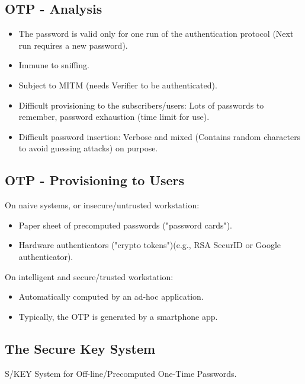 \subsection*{OTP - Analysis}
\begin{itemize}
    \item The password is valid only for one run of the authentication protocol (Next run requires a new password).
    \item Immune to sniffing.
    \item Subject to MITM (needs Verifier to be authenticated).
    \item Difficult provisioning to the subscribers/users: Lots of passwords to remember, password exhaustion (time limit for use).
    \item Difficult password insertion: Verbose and mixed (Contains random characters to avoid guessing attacks) on purpose.
\end{itemize}

\subsection*{OTP - Provisioning to Users}
On naive systems, or insecure/untrusted workstation:
\begin{itemize}
    \item Paper sheet of precomputed passwords ("password cards").
    \item Hardware authenticators ("crypto tokens")(e.g., RSA SecurID or Google authenticator).
\end{itemize}
On intelligent and secure/trusted workstation:
\begin{itemize}
    \item Automatically computed by an ad-hoc application.
    \item Typically, the OTP is generated by a smartphone app.
\end{itemize}

\subsection{The Secure Key System}
\begin{center}
    S/KEY System for Off-line/Precomputed One-Time Passwords.
\end{center}

